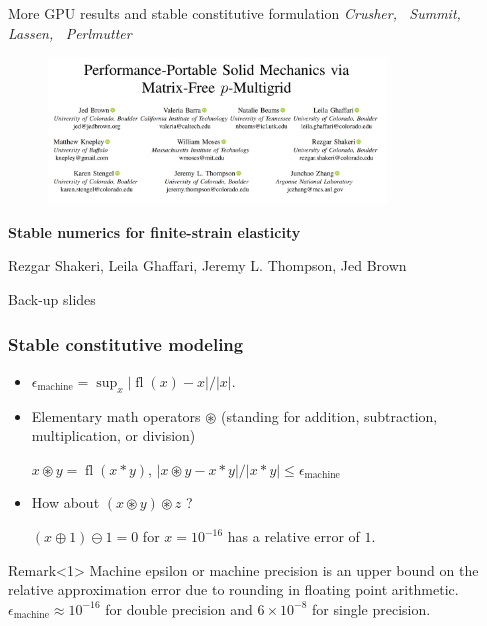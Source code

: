 \documentclass{beamer}
\newcommand\emachine{\epsilon_{\text{machine}}}
\newcommand\fl{\operatorname{fl}}
\begin{document}
\begin{frame}{More GPU results and stable constitutive formulation}
	\textit{Crusher, \, Summit, \, Lassen, \, Perlmutter}
	\begin{figure} [h]
		\includegraphics[width=0.8\textwidth]{../figs/paper.png}
	\end{figure}

	\vspace{10mm}
	\textbf{Stable numerics for finite-strain elasticity}
	
	Rezgar Shakeri, Leila Ghaffari, Jeremy L. Thompson, Jed Brown
\end{frame}


\begin{frame}
	\huge Back-up slides
\end{frame}

\begin{frame}
	\frametitle{Stable constitutive modeling}
	
	\begin{itemize}
		\item<1-> $\emachine = \sup_{x} \lvert \fl(x) - x \rvert / \lvert x \rvert$.
		\item<1-> Elementary math operators \alert{$\circledast$} (standing for addition, subtraction, multiplication, or division)
		
		\vspace{5mm}
		$x \circledast y = \fl(x \ast y)$, \quad $\lvert x \circledast y - x \ast y\rvert / \lvert x \ast y \rvert \le \emachine$
		
		\vspace{10mm}
		\item<2-> How about $(x \circledast y) \circledast z$ ?
		
		\vspace{5mm}
		$(x \oplus 1) \ominus 1 = 0$ for $x=10^{-16}$ has a \alert{relative error of $1$.}
	\end{itemize}
	
	
	\begin{block}{Remark}<1>
		Machine epsilon or machine precision is an upper bound on the relative approximation error due to rounding in floating point arithmetic. \alert{$\emachine \approx 10^{-16}$} for double precision and \alert{$6 \times 10^{-8}$} for single precision.
	\end{block}
\end{frame}
\end{document}
